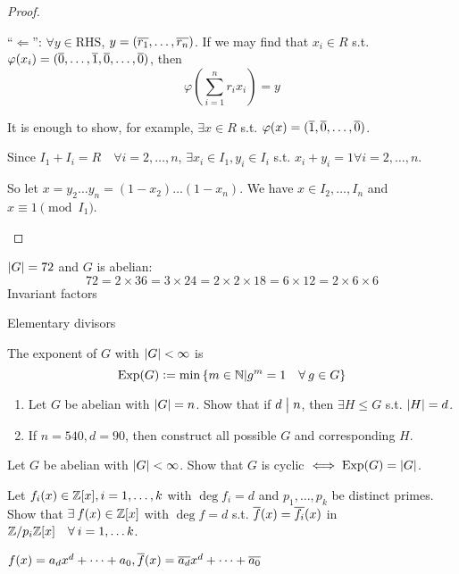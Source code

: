 \begin{theorem}
\begin{proof}
\begin{enumerate}[(1)]
        ``$\Leftarrow$'': $\forall y \in \text{RHS}$,
        $y = (\overline{r_1}, \dots, \overline{r_n})$.
        If we may find that $x_i \in R$ s.t.
        $\varphi(x_i) = (\overline{0}, \dots, \overline{1}, \overline{0}, \dots, \overline{0})$,
        then
        \[
          \varphi\left(\sum_{i=1}^n r_ix_i \right) = y
        \]

        It is enough to show, for example, $\exists x \in R$ s.t.
        $\varphi(x) = (\overline{1}, \overline{0}, \dots, \overline{0})$.

        Since $I_1 + I_i = R \quad \forall i = 2, \dots, n$,
        $\exists x_i \in I_1, y_i \in I_i$ s.t. $x_i + y_i = 1
        \forall i = 2, \dots, n$.

        So let $x = y_2\dots y_n = (1-x_2)\dots(1-x_n)$.
        We have $x \in I_2, \dots, I_n$ and $x \equiv 1 \pmod {I_1}$.
    \end{enumerate}
  \end{proof}
\end{theorem}

\begin{example}
  $\lvert G\rvert = 72$ and $G$ is abelian:
  \[
    72 = 2 \times 36 = 3 \times 24 = 2 \times 2 \times 18
    = 6 \times 12 = 2 \times 6 \times 6
  \]
  Invariant factors

  Elementary divisors
\end{example}

\begin{definition}
  The exponent of $G$ with $\lvert G\rvert < \infty$ is
  \[
    \Exp(G) \defeq \min \left\{
      m \in \Nb \middle| g^m = 1 \quad \forall g \in G
    \right\}
  \]
\end{definition}

\begin{exercise} \mbox{}
  \begin{enumerate}
    \item Let $G$ be abelian with $\lvert G\rvert = n$. Show that if $d \mathrel{\big|} n$, then
      $\exists H \le G$ s.t. $\lvert H\rvert = d$.
    \item If $n=540, d=90$, then construct all possible $G$ and
      corresponding $H$.
  \end{enumerate}
\end{exercise}

\begin{exercise}
  Let $G$ be abelian with $\lvert G\rvert < \infty$. Show that $G$ is cyclic
  $\iff \operatorname{Exp}(G) = \lvert G\rvert$.
\end{exercise}

\begin{exercise}
  Let $f_i(x) \in \mathbb{Z}[x], i = 1, \dots, k$ with $\deg f_i = d$ and
  $p_1, \dots, p_k$ be distinct primes.
  Show that $\exists f(x) \in \Zb[x]$ with $\deg f = d$ s.t.
  $\overline{f}(x) = \overline{f_i}(x)$ in 
  $\quot{\Zb}{p_i\Zb}[x] \quad \forall i = 1, \dots k$.

  $f(x) = a_d x^d + \dots + a_0,
  \overline{f}(x) = \overline{a_d} x^d + \dots + \overline{a_0}$
\end{exercise}

